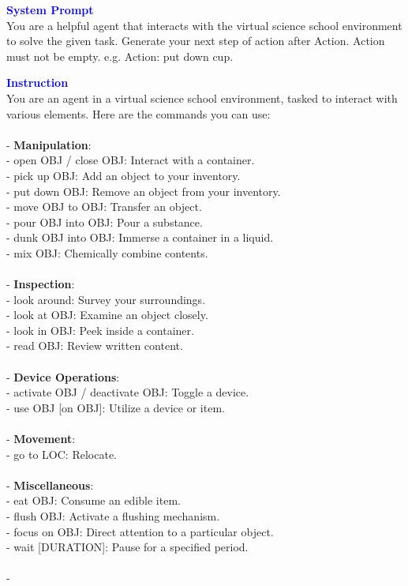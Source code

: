 \begin{tcolorbox}[breakable,title=Prompt Details for ScienceWorld]
\textbf{\textcolor{blue}{System Prompt}}\\ 
You are a helpful agent that interacts with the virtual science school environment to solve the given task.  Generate your next step of action after Action. Action must not be empty. e.g. Action: put down cup.\\
\textbf{\textcolor{blue}{Instruction}}\\
You are an agent in a virtual science school environment, tasked to interact with various elements. Here are the commands you can use:\\ \\ - \textbf{Manipulation}: \\  - open {OBJ} / close {OBJ}: Interact with a container.\\  - pick up {OBJ}: Add an object to your inventory.\\  - put down {OBJ}: Remove an object from your inventory.\\  - move {OBJ} to {OBJ}: Transfer an object.\\  - pour {OBJ} into {OBJ}: Pour a substance.\\  - dunk {OBJ} into {OBJ}: Immerse a container in a liquid.\\  - mix {OBJ}: Chemically combine contents.\\ \\- \textbf{Inspection}:\\  - look around: Survey your surroundings.\\  - look at {OBJ}: Examine an object closely.\\  - look in {OBJ}: Peek inside a container.\\  - read {OBJ}: Review written content.\\ \\- \textbf{Device Operations}:\\  - activate {OBJ} / deactivate {OBJ}: Toggle a device.\\  - use {OBJ} [on {OBJ}]: Utilize a device or item.\\ \\- \textbf{Movement}:\\  - go to {LOC}: Relocate.\\ \\- \textbf{Miscellaneous}:\\  - eat {OBJ}: Consume an edible item.\\  - flush {OBJ}: Activate a flushing mechanism.\\  - focus on {OBJ}: Direct attention to a particular object.\\  - wait [DURATION]: Pause for a specified period.\\ \\- 
\end{tcolorbox}
